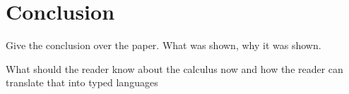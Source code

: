 \section{Conclusion}

Give the conclusion over the paper.
What was shown, why it was shown.

What should the reader know about the calculus now
and how the reader can translate that into typed languages
